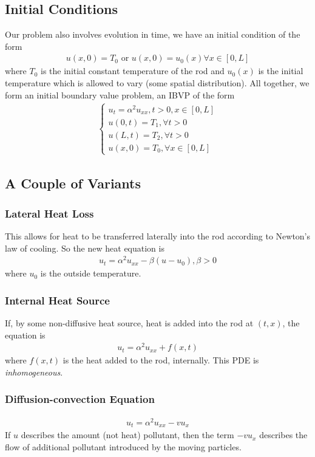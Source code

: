 \documentclass{article}
\theoremstyle{definition}
\begin{document}
\subsection{Initial Conditions}
Our problem also involves evolution in time, we have an initial condition of the form
\begin{align*}
u(x,0) = T_0 \text{ or } u(x,0) = u_0(x) \forall x \in [0,L]
\end{align*}
where $T_0$ is the initial constant temperature of the rod and $u_0(x)$ is the initial temperature which is allowed to vary (some spatial distribution). All together, we form an initial boundary value problem, an IBVP of the form
\begin{align*}
\begin{cases*}
u_t = \alpha^2 u_{xx}, t>0,x\in[0,L]\\
u(0,t) = T_1, \forall t > 0\\
u(L,t) = T_2,\forall t > 0\\
u(x,0) = T_0, \forall x\in[0,L]
\end{cases*} 
\end{align*}
\subsection{A Couple of Variants}
\subsubsection{Lateral Heat Loss}
This allows for heat to be transferred laterally into the rod according to Newton's law of cooling. So the new heat equation is
\begin{align*}
u_t = \alpha^2 u_{xx} -\beta(u - u_0), \beta > 0
\end{align*}
where $u_0$ is the outside temperature.
\subsubsection{Internal Heat Source}
If, by some non-diffusive heat source, heat is added into the rod at $(t,x)$, the equation is
\begin{align*}
u_t = \alpha^2 u_{xx} + f(x,t)
\end{align*}
where $f(x,t)$ is the heat added to the rod, internally. This PDE is \textit{inhomogeneous}.
\subsubsection{Diffusion-convection Equation}
\begin{align*}
u_t = \alpha^2 u_{xx} - vu_x
\end{align*}
If $u$ describes the amount (not heat) pollutant, then the term $-vu_x$ describes the flow of additional pollutant introduced by the moving particles. 
\end{document}
